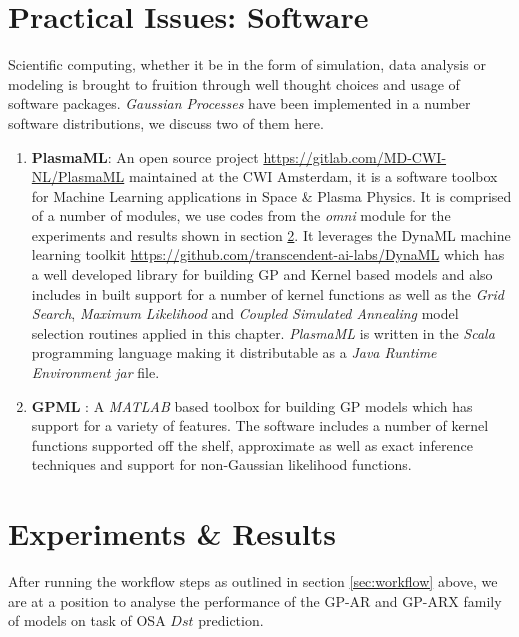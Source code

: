 \documentclass{article}
\begin{document}
\section{Practical Issues: Software}

Scientific computing, whether it be in the form of simulation, data
analysis or modeling is brought to fruition through well thought
choices and usage of software packages. \emph{Gaussian Processes} have
been implemented in a number software distributions, we discuss two of
them here.

\begin{enumerate}

\item \textbf{PlasmaML}: An open source project
  \url{https://gitlab.com/MD-CWI-NL/PlasmaML} maintained at the CWI
  Amsterdam, it is a software toolbox for Machine Learning
  applications in Space \& Plasma Physics. It is comprised of a number
  of modules, we use codes from the \textit{omni} module for the
  experiments and results shown in section \ref{sec:results}. It
  leverages the DynaML machine learning toolkit
  \url{https://github.com/transcendent-ai-labs/DynaML} which has a
  well developed library for building GP and Kernel based models and
  also includes in built support for a number of kernel functions as
  well as the \emph{Grid Search}, \emph{Maximum Likelihood} and
  \emph{Coupled Simulated Annealing} model selection routines applied
  in this chapter. \textit{PlasmaML} is written in the \textit{Scala}
  programming language making it distributable as a \emph{Java Runtime
    Environment} \textit{jar} file.

\item \textbf{GPML} \citep{GPML}: A \emph{MATLAB} based toolbox for
  building GP models which has support for a variety of features. The
  software includes a number of kernel functions supported off the
  shelf, approximate as well as exact inference techniques and support
  for non-Gaussian likelihood functions. 
\end{enumerate}

\section{Experiments \& Results}\label{sec:results}

After running the workflow steps as outlined in section
\ref{sec:workflow} above, we are at a position to analyse the
performance of the GP-AR and GP-ARX family of models on task of OSA
$Dst$ prediction.
\end{document}
